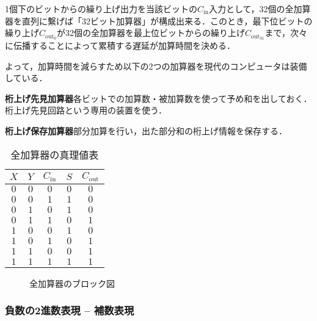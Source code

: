 1個下のビットからの繰り上げ出力を当該ビットの$C_{\mathrm{in}}$入力として，32個の全加算器を直列に繫げば「32ビット加算器」が構成出来る．このとき，最下位ビットの繰り上げ$C_{\mathrm{out}_0}$が32個の全加算器を最上位ビットからの繰り上げ$C_{\mathrm{out}_{31}}$まで，次々に伝播することによって累積する遅延が加算時間を決める．

よって，加算時間を減らすため以下の2つの加算器を現代のコンピュータは装備している．

\begin{enumerate}[label=\textbf{[\arabic*]}, labelsep=10pt, leftmargin=23pt]
	\item \textbf{桁上げ先見加算器}\qquad 各ビットでの加算数・被加算数を使って予め和を出しておく．桁上げ先見回路という専用の装置を使う．
	\item \textbf{桁上げ保存加算器}\qquad 部分加算を行い，出た部分和の桁上げ情報を保存する．
\end{enumerate}

\begin{table}[H]
	\caption{全加算器の真理値表}
	\label{tab14-3}
	\centering
	\begin{tabular}{c|c|c||c|c}
		\hline
		$X$ & $Y$ & $C_{\mathrm{in}}$ & $S$ & $C_{\mathrm{out}}$\\
        \hline\hline
        $0$ & $0$ & $0$ & $0$ & $0$\\
        $0$ & $0$ & $1$ & $1$ & $0$\\
        $0$ & $1$ & $0$ & $1$ & $0$\\
        $0$ & $1$ & $1$ & $0$ & $1$\\
        $1$ & $0$ & $0$ & $1$ & $0$\\
        $1$ & $0$ & $1$ & $0$ & $1$\\
        $1$ & $1$ & $0$ & $0$ & $1$\\
        $1$ & $1$ & $1$ & $1$ & $1$\\
		\hline
	\end{tabular}
\end{table}

\begin{figure}[H]
	\begin{center}
		\caption{全加算器のブロック図}
		\label{fig14-4}
	\end{center}
\end{figure}



\subsubsection{負数の2進数表現 -- 補数表現}

